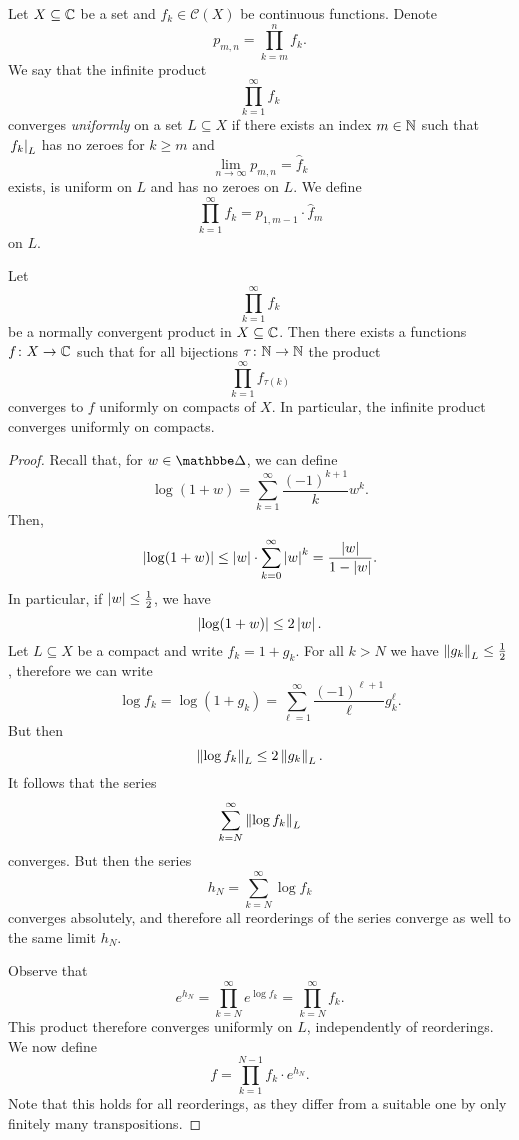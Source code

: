 \begin{definicija}
Let $X \subseteq \mathbb{C}$ be a set and $f_k \in \mathcal{C}(X)$ be
continuous functions. Denote
\[
p_{m,n} = \prod_{k=m}^n f_k.
\]
We say that the infinite product
\[
\prod_{k=1}^\infty f_k
\]
converges \emph{uniformly} on a set
$L \subseteq X$ if there exists an index $m \in \mathbb{N}$ such that
$\left. f_k\right|_{L}^{}$ has no zeroes for $k \geq m$ and
\[
\lim_{n \to \infty} p_{m,n} = \widehat{f}_k
\]
exists, is uniform on $L$ and has no zeroes on $L$. We define
\[
\prod_{k=1}^\infty f_k = p_{1, m-1} \cdot \widehat{f}_m
\]
on $L$.
\end{definicija}

\begin{izrek}
Let
\[
\prod_{k=1}^\infty f_k
\]
be a normally convergent product in $X \subseteq \mathbb{C}$. Then there
exists a functions $f \colon X \to \mathbb{C}$ such that for all bijections
$\tau \colon \mathbb{N} \to \mathbb{N}$ the product
\[
\prod_{k=1}^\infty f_{\tau(k)}
\]
converges to $f$ uniformly on compacts of $X$. In particular, the
infinite product converges uniformly on compacts.
\end{izrek}

\begin{proof}
Recall that, for $w \in \dsk$, we can define
\[
\log(1+w) = \sum_{k=1}^\infty \frac{(-1)^{k+1}}{k} w^k.
\]
Then,
\[
\left\lvert \log(1+w)\right\rvert \leq
\left\lvert w\right\rvert \cdot \sum_{k=0}^\infty \left\lvert w\right\rvert^k =
\frac{\left\lvert w\right\rvert}{1 - \left\lvert w\right\rvert}.
\]
In particular, if $\left\lvert w\right\rvert \leq \frac{1}{2}$, we have
\[
\left\lvert \log(1+w)\right\rvert \leq 2 \left\lvert w\right\rvert.
\]
Let $L \subseteq X$ be a compact and write $f_k = 1 + g_k$. For
all $k > N$ we have $\left\lVert g_k\right\rVert_L \leq \frac{1}{2}$, therefore we
can write
\[
\log f_k =
\log(1 + g_k) =
\sum_{\ell=1}^\infty \frac{(-1)^{\ell+1}}{\ell} g_k^\ell.
\]
But then
\[
\left\lVert \log f_k\right\rVert_L \leq 2 \left\lVert g_k\right\rVert_L.
\]
It follows that the series
\[
\sum_{k=N}^\infty \left\lVert \log f_k\right\rVert_L
\]
converges. But then the series
\[
h_N = \sum_{k=N}^\infty \log f_k
\]
converges absolutely, and therefore all reorderings of the series
converge as well to the same limit $h_N$.

Observe that
\[
e^{h_N} = \prod_{k=N}^\infty e^{\log f_k} = \prod_{k=N}^\infty f_k.
\]
This product therefore converges uniformly on $L$, independently of
reorderings. We now define
\[
f = \prod_{k=1}^{N-1} f_k \cdot e^{h_N}.
\]
Note that this holds for all reorderings, as they differ from a
suitable one by only finitely many transpositions.
\end{proof}

